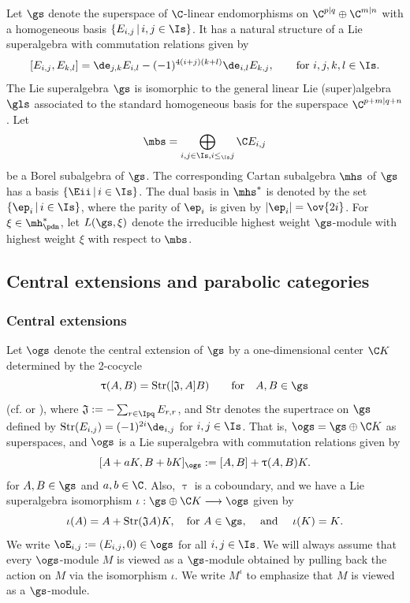 \documentclass[11pt, reqno]{amsart}
\theoremstyle{definition}
\theoremstyle{remark}
\numberwithin{equation}{section}
\begin{document}
Let $\gs$ denote the superspace of $\C$-linear endomorphisms on $\C^{p|q}\oplus\C^{m|n}$ with a homogeneous basis $\{ E_{i,j} \, | \, i, j \in \Is \}$.
It has a natural structure of a Lie superalgebra with commutation relations given by
$$
[E_{i,j}, E_{k, l}]=\de_{j,k} E_{i,l}-(-1)^{4(i+j)(k+l)}\de_{i, l} E_{k,j}, \qquad \mbox{for $i, j, k, l \in \Is$.}
$$
The Lie superalgebra $\gs$ is isomorphic to the general linear Lie (super)algebra $\gls$ associated to the standard homogeneous basis for the superspace $\C^{p+m|q+n}$.
%
Let
$$
\mbs=\bigoplus_{\substack{ i,j \in \Is, i \le_\Is j} }  \C E_{i,j}
$$
be a Borel subalgebra of $\gs$.
The corresponding Cartan subalgebra $\mhs$ of $\gs$ has a basis $\{ \Eii \, | \, i \in \Is \}$.
The dual basis in $\mhs^{*}$ is denoted by the set $\{ \ep_i \, | \, i \in \Is \}$, where the parity of $\ep_i$ is given by $|\ep_i|=\ov{2i}$.
For $\xi \in \mh_\pdn^{*}$, let $L(\gs, \xi)$ denote the irreducible highest weight $\gs$-module with highest weight $\xi$ with respect to $\mbs$.


\subsection{Central extensions and parabolic categories} \label{P-cat}
\subsubsection{Central extensions}
Let $\ogs$ denote the central extension of $\gs$ by a one-dimensional center $\C K$ determined by the 2-cocycle
$$
\uptau(A, B)=\text{Str}([\mathfrak{J},A]B) \qquad \text{for} \quad A,B\in \gs
$$
(cf. \cite[p. 115]{CLW12} or \cite[p. 99]{CL03}), where $\mathfrak{J}:=-\sum_{r \in \Ipq} E_{r,r}$, and $\text{Str}$ denotes the supertrace on $\gs$ defined by $\text{Str}(E_{i,j})=(-1)^{2i} \de_{i,j}$ for $i,j \in \Is$.
That is, $\ogs=\gs \oplus \C K$ as superspaces, and $\ogs$ is a Lie superalgebra with commutation relations given by
$$
[A+aK, B+bK]_{\ogs}:=[A, B]+\uptau(A,B)K.
$$
for $A, B \in \gs$ and $a, b \in \C$.
Also, $\uptau$ is a coboundary, and we have a Lie superalgebra isomorphism
$
\iota: \gs\oplus \C K \longrightarrow \ogs
$
given by
\begin{equation}\label{iso-e}
  \iota(A)=A+\mbox{Str}(\mathfrak{J} A)K, \quad \mbox{for $A \in \gs$, \quad and \quad $\iota(K)=K$.}
\end{equation}
We write $\oE_{i,j}:=(E_{i,j}, 0) \in \ogs$ for all $i, j \in \Is$.
We will always assume that every $\ogs$-module $M$ is viewed as a $\gs$-module obtained by
pulling back the action on $M$ via the isomorphism $\iota$.
We write $M^\iota$ to emphasize that $M$ is viewed as a $\gs$-module.
\end{document}
